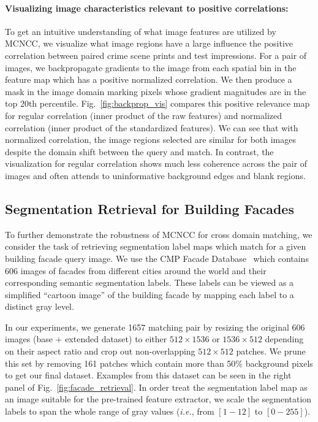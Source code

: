 \documentclass[twocolumn]{svjour3}           %
\newcommand{\ie}{\emph{i.e.}}
\begin{document}
\paragraph{Visualizing image characteristics relevant to positive correlations:}
To get an intuitive understanding of what image features are utilized by MCNCC,
we visualize what image regions have a large influence the positive correlation
between paired crime scene prints and test impressions.  For a pair of images,
we backpropagate gradients to the image from each spatial bin in the feature
map which has a positive normalized correlation. We then produce a mask in the
image domain marking pixels whose gradient magnitudes are in the
top 20th percentile.  Fig.~\ref{fig:backprop_vis} compares this positive
relevance map for regular correlation (inner product of the raw features) and
normalized correlation (inner product of the standardized features).  We can
see that with normalized correlation, the image regions selected are similar
for both images despite the domain shift between the query and match.  In
contrast, the visualization for regular correlation shows much less coherence
across the pair of images and often attends to uninformative background edges
and blank regions.

\subsection{Segmentation Retrieval for Building Facades}
To further demonstrate the robustness of MCNCC for cross domain matching, we
consider the task of retrieving segmentation label maps which match for a given
building facade query image.  We use the CMP Facade
Database~\cite{tylecek2013spatial} which contains 606 images of facades from
different cities around the world and their corresponding semantic segmentation
labels. These labels can be viewed as a simplified ``cartoon image'' of the 
building facade by mapping each label to a distinct gray level.

In our experiments, we generate 1657 matching pair by resizing the original 606
images (base + extended dataset) to either $512 \times 1536$ or $1536 \times 512$
depending on their aspect ratio and crop out non-overlapping $512 \times 512$
patches.  We prune this set by removing 161 patches which contain more than
50\% background pixels to get our final dataset.  Examples from this dataset
can be seen in the right panel of Fig.~\ref{fig:facade_retrieval}. In order treat the 
segmentation label map as an image suitable for the pre-trained feature extractor,
we scale the segmentation labels to span the whole range of gray values (\ie,
from $[1-12]$ to $[0-255]$).
\end{document}
